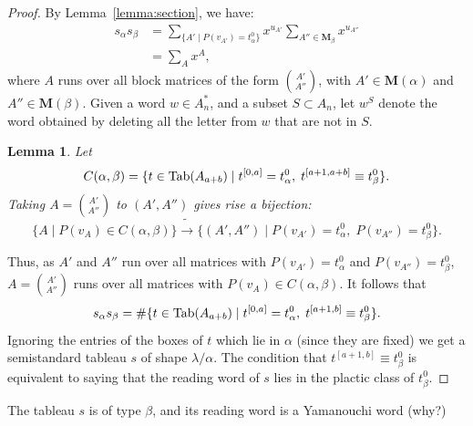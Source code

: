 \documentclass[11pt]{amsart}
\newtheorem{lemma}[theorem]{Lemma}
\theoremstyle{definition}
\theoremstyle{example}
\newcommand{\Tab}{\textup{Tab}}
\begin{document}
\begin{proof}
  By Lemma~\ref{lemma:section}, we have:
  \begin{align*}
    s_\alpha s_\beta & = \sum_{\{A'\mid P(v_{A'}) = t^0_\alpha\}} x^{u_{A'}} \sum_{A''\in \mathbf M_{\beta}} x^{u_{A''}}\\
    & = \sum_A x^A,
  \end{align*}
  where $A$ runs over all block matrices of the form $\binom{A'}{A''}$, with $A'\in \mathbf M(\alpha)$ and $A''\in \mathbf M(\beta)$.
  Given a word $w\in A_n^*$, and a subset $S\subset A_n$, let $w^S$ denote the word obtained by deleting all the letter from $w$ that are not in $S$.
  \begin{lemma}
    Let 
    \begin{displaymath}
      C(\alpha,\beta) = \{t\in \Tab(A_{a+b}) \mid t^{[0, a]} = t^0_\alpha,\;t^{[a+1, a+b]} \equiv t^0_\beta\}.
    \end{displaymath}
    Taking $A = \binom{A'}{A''}$ to $(A', A'')$ gives rise a bijection:
    \begin{displaymath}
      \{A\mid P(v_A) \in C(\alpha,\beta)\} \tilde\to \{(A', A'')\mid P(v_{A'}) = t^0_\alpha,\; P(v_{A''}) = t^0_\beta\}.
    \end{displaymath}
  \end{lemma}
  Thus, as $A'$ and $A''$ run over all matrices with $P(v_{A'})=t^0_\alpha$ and $P(v_{A''})=t^0_\beta$, $A=\binom{A'}{A''}$ runs over all matrices with $P(v_A)\in C(\alpha,\beta)$.
  It follows that
  \begin{displaymath}
    s_\alpha s_\beta = \#\{t\in \Tab(A_{a+b})\mid t^{[0,a]} = t^0_\alpha,\; t^{[a+1,b]}\equiv t^0_\beta\}.
  \end{displaymath}
  Ignoring the entries of the boxes of $t$ which lie in $\alpha$ (since they are fixed) we get a semistandard tableau $s$ of shape $\lambda/\alpha$.
  The condition that $t^{[a+1,b]}\equiv t^0_\beta$ is equivalent to saying that the reading word of $s$ lies in the plactic class of $t^0_\beta$.
\end{proof}
The tableau $s$ is of type $\beta$, and its reading word is a Yamanouchi word (why?)


\end{document}
